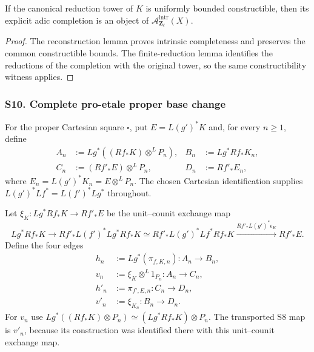 \begin{lemma}
\label{lemma:weil-efi-coeff-completion-in-intrinsic-category}
If the canonical reduction tower of $K$ is uniformly bounded constructible,
then its explicit adic completion is an object of
$\mathscr A^{\mathrm{intr}}_{\mathbf Z_\ell}(X)$.
\end{lemma}
\begin{proof}
The reconstruction lemma proves intrinsic completeness and preserves the
common constructible bounds.  The finite-reduction lemma identifies the
reductions of the completion with the original tower, so the same
constructibility witness applies.
\end{proof}

\subsubsection{S10. Complete pro-etale proper base change}

\begin{definition}
\label{def:weil-pbc-level-map-corners}
For the proper Cartesian square $\square$, put $E=L(g')^*K$ and, for every
$n\geq1$, define
\[
\begin{aligned}
 A_n&:=Lg^*((Rf_*K)\otimes^LP_n),&
 B_n&:=Lg^*Rf_*K_n,\\
 C_n&:=(Rf'_*E)\otimes^LP_n,&
 D_n&:=Rf'_*E_n,
\end{aligned}
\]
where $E_n=L(g')^*K_n=E\otimes^LP_n$.  The chosen Cartesian
identification supplies
$L(g')^*Lf^*=L(f')^*Lg^*$ throughout.
\end{definition}

\begin{definition}
\label{def:weil-pbc-level-map-arrows}
Let $\xi_K:Lg^*Rf_*K\to Rf'_*E$ be the unit--counit exchange map
\[
 Lg^*Rf_*K\longrightarrow
 Rf'_*L(f')^*Lg^*Rf_*K
 \simeq Rf'_*L(g')^*Lf^*Rf_*K
 \xrightarrow{Rf'_*L(g')^*\epsilon_K}Rf'_*E.
\]
Define the four edges
\[
\begin{aligned}
 h_n&:=Lg^*(\pi_{f,K,n}):A_n\longrightarrow B_n,\\
 v_n&:=\xi_K\otimes^L1_{P_n}:A_n\longrightarrow C_n,\\
 h'_n&:=\pi_{f',E,n}:C_n\longrightarrow D_n,\\
 v'_n&:=\xi_{K_n}:B_n\longrightarrow D_n.
\end{aligned}
\]
For $v_n$ use
$Lg^*((Rf_*K)\otimes P_n)\simeq(Lg^*Rf_*K)\otimes P_n$.
The transported S8 map is $v'_n$, because its construction was identified
there with this unit--counit exchange map.
\end{definition}


